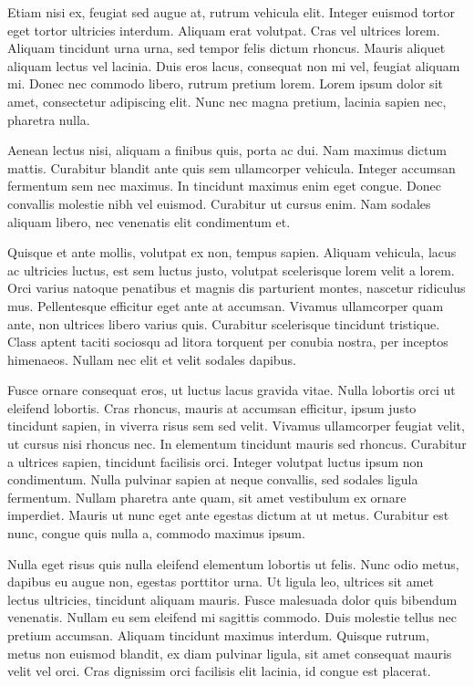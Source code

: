 \documentclass[
  a5paper,
  smalldemyvopaper,10pt,twoside,onecolumn,openright,extrafontsizes,hidelinks]{memoir}
\begin{document}
Etiam nisi ex, feugiat sed augue at, rutrum vehicula elit. Integer
euismod tortor eget tortor ultricies interdum. Aliquam erat volutpat.
Cras vel ultrices lorem. Aliquam tincidunt urna urna, sed tempor felis
dictum rhoncus. Mauris aliquet aliquam lectus vel lacinia. Duis eros
lacus, consequat non mi vel, feugiat aliquam mi. Donec nec commodo
libero, rutrum pretium lorem. Lorem ipsum dolor sit amet, consectetur
adipiscing elit. Nunc nec magna pretium, lacinia sapien nec, pharetra
nulla.

Aenean lectus nisi, aliquam a finibus quis, porta ac dui. Nam maximus
dictum mattis. Curabitur blandit ante quis sem ullamcorper vehicula.
Integer accumsan fermentum sem nec maximus. In tincidunt maximus enim
eget congue. Donec convallis molestie nibh vel euismod. Curabitur ut
cursus enim. Nam sodales aliquam libero, nec venenatis elit condimentum
et.

Quisque et ante mollis, volutpat ex non, tempus sapien. Aliquam
vehicula, lacus ac ultricies luctus, est sem luctus justo, volutpat
scelerisque lorem velit a lorem. Orci varius natoque penatibus et magnis
dis parturient montes, nascetur ridiculus mus. Pellentesque efficitur
eget ante at accumsan. Vivamus ullamcorper quam ante, non ultrices
libero varius quis. Curabitur scelerisque tincidunt tristique. Class
aptent taciti sociosqu ad litora torquent per conubia nostra, per
inceptos himenaeos. Nullam nec elit et velit sodales dapibus.

Fusce ornare consequat eros, ut luctus lacus gravida vitae. Nulla
lobortis orci ut eleifend lobortis. Cras rhoncus, mauris at accumsan
efficitur, ipsum justo tincidunt sapien, in viverra risus sem sed velit.
Vivamus ullamcorper feugiat velit, ut cursus nisi rhoncus nec. In
elementum tincidunt mauris sed rhoncus. Curabitur a ultrices sapien,
tincidunt facilisis orci. Integer volutpat luctus ipsum non condimentum.
Nulla pulvinar sapien at neque convallis, sed sodales ligula fermentum.
Nullam pharetra ante quam, sit amet vestibulum ex ornare imperdiet.
Mauris ut nunc eget ante egestas dictum at ut metus. Curabitur est nunc,
congue quis nulla a, commodo maximus ipsum.

Nulla eget risus quis nulla eleifend elementum lobortis ut felis. Nunc
odio metus, dapibus eu augue non, egestas porttitor urna. Ut ligula leo,
ultrices sit amet lectus ultricies, tincidunt aliquam mauris. Fusce
malesuada dolor quis bibendum venenatis. Nullam eu sem eleifend mi
sagittis commodo. Duis molestie tellus nec pretium accumsan. Aliquam
tincidunt maximus interdum. Quisque rutrum, metus non euismod blandit,
ex diam pulvinar ligula, sit amet consequat mauris velit vel orci. Cras
dignissim orci facilisis elit lacinia, id congue est placerat.
\end{document}
